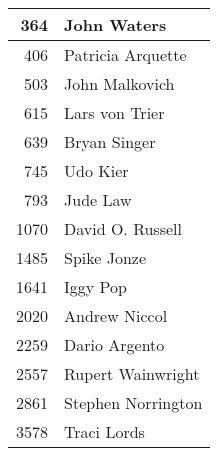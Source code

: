 \documentclass[dvipsnames]{beamer}
\theoremstyle{plain}
\begin{document}
\begin{frame}
\begin{example}[PERSON]
\begin{columns}[b]
      \begin{tiny}
      \begin{table}
        \begin{tabular}{|r|l|}\hline
 364 & John Waters          \\\hline
 406 & Patricia Arquette    \\\hline
 503 & John Malkovich       \\\hline
 615 & Lars von Trier       \\\hline
 639 & Bryan Singer         \\\hline
 745 & Udo Kier             \\\hline
 793 & Jude Law             \\\hline
1070 & David O. Russell     \\\hline
1485 & Spike Jonze          \\\hline
1641 & Iggy Pop             \\\hline
2020 & Andrew Niccol        \\\hline
2259 & Dario Argento        \\\hline
2557 & Rupert Wainwright    \\\hline
2861 & Stephen Norrington   \\\hline
3578 & Traci Lords          \\\hline
        \end{tabular}
      \end{table}
      \end{tiny}
  \end{columns}
  \end{example}
\end{frame}
\end{document}
